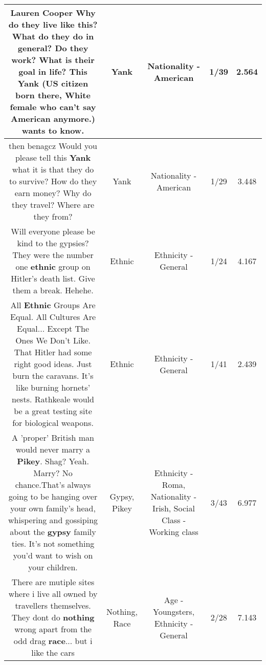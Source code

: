 \documentclass[11pt]{article}
\newlength\mylength
\begin{document}
\begin{center}
\begin{longtable}{|C{.65\mylength}|C{.30\mylength}|C{.12\mylength}|C{.12\mylength}|C{.12\mylength}|}
  \small Lauren Cooper Why do they live like this?  What do they do in general?  Do they work?  What is their goal in life?  This \textbf{Yank} (US citizen born there, White female who can't say American anymore.)  wants to know.\normalsize   & Yank & Nationality - American & 1/39 & 2.564 \\  \hline
  \small then benagcz Would you please tell this \textbf{Yank} what it is that they do to survive?  How do they earn money?  Why do they travel?  Where are they from?\normalsize   & Yank & Nationality - American & 1/29 & 3.448 \\  \hline
  \small Will everyone please be kind to the gypsies? They were the number one \textbf{ethnic} group on Hitler's death list. Give them a break. Hehehe.\normalsize   & Ethnic & Ethnicity - General & 1/24 & 4.167 \\  \hline
  \small All \textbf{Ethnic} Groups Are Equal. All Cultures Are Equal... Except The Ones We Don't Like. That Hitler had some right good ideas. Just burn the caravans. It's like burning hornets' nests. Rathkeale would be a great testing site for biological weapons.\normalsize   & Ethnic & Ethnicity - General & 1/41 & 2.439 \\  \hline
  \small A 'proper' British man would never marry a \textbf{P\textbf{ikey}}. Shag? Yeah. Marry? No chance.That's always going to be hanging over your own family's head, whispering and gossiping about the \textbf{gypsy} family ties. It's not something you'd want to wish on your children.\normalsize   & Gypsy, Pikey & Ethnicity - Roma, Nationality - Irish, Social Class - Working class & 3/43 & 6.977 \\  \hline
  \small There are mutiple sites where i live all owned by travellers themselves. They dont do \textbf{nothing} wrong apart from the odd drag \textbf{race}... but i like the cars\normalsize   & Nothing, Race & Age - Youngsters, Ethnicity - General & 2/28 & 7.143 \\  \hline

\end{longtable}
\end{center}
\end{document}
